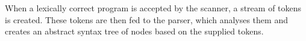 

When a lexically correct program is accepted by the scanner, a
stream of tokens is created. These tokens are then fed to the parser,
which analyses them and creates an abstract syntax tree of nodes based
on the supplied tokens.
